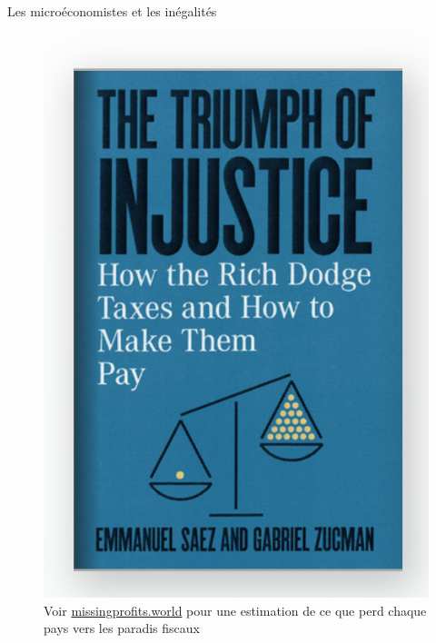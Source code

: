 \documentclass[handout]{beamer}
\begin{document}
\begin{frame}{Les microéconomistes et les inégalités}

\begin{figure}
	\includegraphics[scale=0.35]{justice.png}
	\caption{Voir \href{https://missingprofits.world/}{missingprofits.world} pour une estimation de ce que perd chaque pays vers les paradis fiscaux}
\end{figure}

\end{frame}
\end{document}
